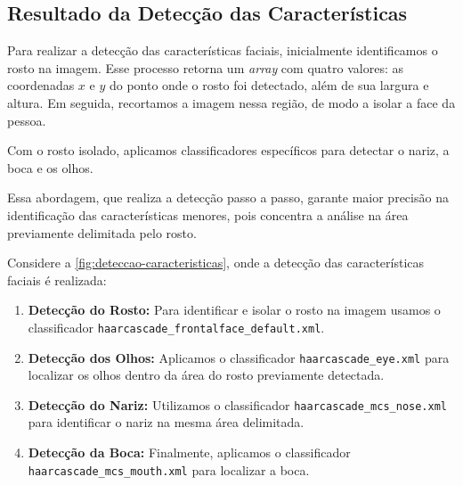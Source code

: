 
\subsection{Resultado da Detecção das Características}

Para realizar a detecção das características faciais, inicialmente identificamos o rosto na imagem. Esse processo retorna um \textit{array} com quatro valores: as coordenadas $x$ e $y$ do ponto onde o rosto foi detectado, além de sua largura e altura. Em seguida, recortamos a imagem nessa região, de modo a isolar a face da pessoa.

Com o rosto isolado, aplicamos classificadores específicos para detectar o nariz, a boca e os olhos.

Essa abordagem, que realiza a detecção passo a passo, garante maior precisão na identificação das características menores, pois concentra a análise na área previamente delimitada pelo rosto.

Considere a \autoref{fig:deteccao-caracteristicas}, onde a detecção das características faciais é realizada:
\begin{enumerate}
    \item \textbf{Detecção do Rosto:} Para identificar e isolar o rosto na imagem usamos o classificador \texttt{haarcascade\_frontalface\_default.xml}.
    \item \textbf{Detecção dos Olhos:} Aplicamos o classificador \texttt{haarcascade\_eye.xml} para localizar os olhos dentro da área do rosto previamente detectada.
    \item \textbf{Detecção do Nariz:} Utilizamos o classificador \texttt{haarcascade\_mcs\_nose.xml} para identificar o nariz na mesma área delimitada.
    \item \textbf{Detecção da Boca:} Finalmente, aplicamos o classificador \\
    \texttt{haarcascade\_mcs\_mouth.xml} para localizar a boca.
\end{enumerate}

